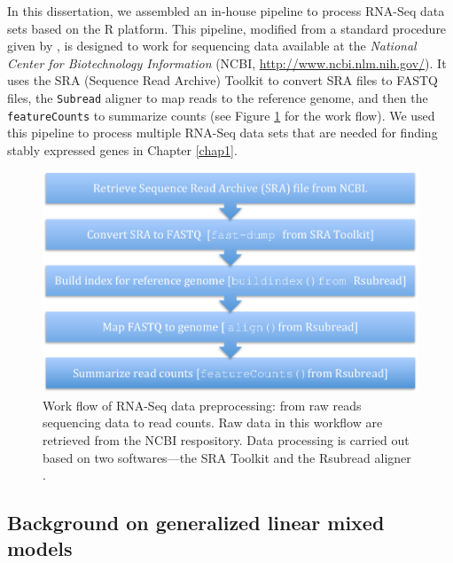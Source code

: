 In this dissertation, we assembled an in-house pipeline to process RNA-Seq data sets based on the R 
\citep{Rpackage} platform. This pipeline, modified from a standard procedure given by 
\citet{anders2013count}, is designed to work for sequencing data available at the \textit{National 
Center for Biotechnology Information} (NCBI, \url{http://www.ncbi.nlm.nih.gov/}). It uses the SRA 
(Sequence Read Archive) Toolkit \citep{leinonen2010sequence} to convert SRA files to FASTQ files, 
the \verb|Subread| aligner \citep{liao2013subread} to map reads to the reference genome, and then 
the \verb|featureCounts| \citep{liao2013featurecounts} to summarize counts (see Figure 
\ref{fig:flowchart} for the work flow). We used this pipeline to process multiple RNA-Seq data 
sets that are needed for finding stably expressed genes in Chapter \ref{chap1}.
\begin{figure}[!ht]
	\centering
	\includegraphics[width=0.7\linewidth]{Figures/flowchart.pdf}
	\caption[Work flow of RNA-Seq data preprocessing]{Work flow of RNA-Seq data preprocessing: from 
	raw reads sequencing data to read counts. Raw 
	data in this workflow are retrieved from the NCBI respository. Data processing is carried out 
	based on two softwares---the SRA Toolkit \citep{leinonen2010sequence} and the Rsubread aligner 
	\citep{liao2013subread}.}
	\label{fig:flowchart}
\end{figure}	



\subsection{Background on generalized linear mixed models}\label{subsec:glmm}

